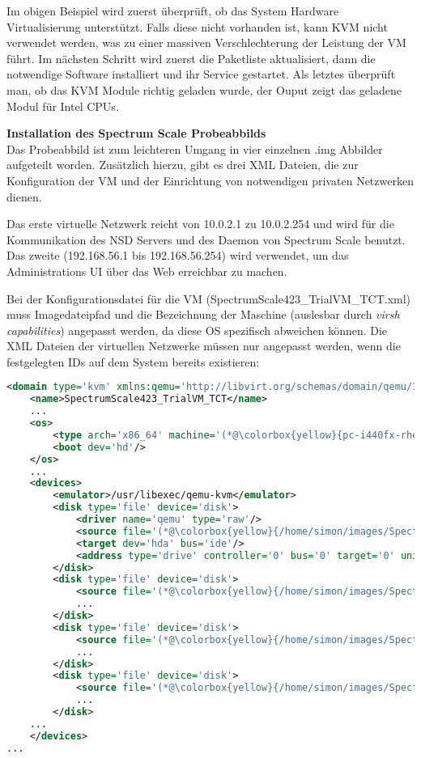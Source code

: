 Im obigen Beispiel wird zuerst überprüft, ob das System Hardware Virtualisierung unterstützt. Falls diese nicht vorhanden ist, kann KVM nicht verwendet werden, was zu einer massiven Verschlechterung der Leistung der VM führt.
Im nächsten Schritt wird zuerst die Paketliste aktualisiert, dann die notwendige Software installiert und ihr Service gestartet. Als letztes überprüft man, ob das KVM Module richtig geladen wurde, der Ouput zeigt das geladene Modul für Intel CPUs.

\textbf{Installation des Spectrum Scale Probeabbilds}\\
Das Probeabbild ist zum leichteren Umgang in vier einzelnen .img Abbilder aufgeteilt worden. Zusätzlich hierzu, gibt es drei XML Dateien, die zur Konfiguration der VM und der Einrichtung von notwendigen privaten Netzwerken dienen.

Das erste virtuelle Netzwerk reicht von 10.0.2.1 zu 10.0.2.254 und wird für die Kommunikation des \acs{NSD} Servers und des Daemon von Spectrum Scale benutzt. Das zweite (192.168.56.1 bis 192.168.56.254) wird verwendet, um das Administrations UI über das Web erreichbar zu machen.

Bei der Konfigurationsdatei für die VM (SpectrumScale423\_TrialVM\_TCT.xml) muss Imagedateipfad und die Bezeichnung der Maschine (auslesbar durch \textit{virsh capabilities}) angepasst werden, da diese OS spezifisch abweichen können. Die XML Dateien der virtuellen Netzwerke müssen nur angepasst werden, wenn die festgelegten IDs auf dem System bereits existieren: \\

\begin{lstlisting}[language=xml, caption=Veränderung der relevanten XML Konfiguration]
<domain type='kvm' xmlns:qemu='http://libvirt.org/schemas/domain/qemu/1.0'>
	<name>SpectrumScale423_TrialVM_TCT</name>
	...
	<os>
		<type arch='x86_64' machine='(*@\colorbox{yellow}{pc-i440fx-rhel7.0.0}@*)'>hvm</type> 
		<boot dev='hd'/>
	</os>
	...
	<devices>
		<emulator>/usr/libexec/qemu-kvm</emulator>
		<disk type='file' device='disk'>
			<driver name='qemu' type='raw'/>
			<source file='(*@\colorbox{yellow}{/home/simon/images/SpectrumScale421\_TrialVM-disk1.img}@*)'/>
			<target dev='hda' bus='ide'/>
			<address type='drive' controller='0' bus='0' target='0' unit='0'/>
		</disk>
		<disk type='file' device='disk'>
			<source file='(*@\colorbox{yellow}{/home/simon/images/SpectrumScale421\_TrialVM-disk2.img}@*)'/>
			...
		</disk>
		<disk type='file' device='disk'>
			<source file='(*@\colorbox{yellow}{/home/simon/images/SpectrumScale421\_TrialVM-disk3.img}@*)'/>
			...
		</disk>
		<disk type='file' device='disk'>
			<source file='(*@\colorbox{yellow}{/home/simon/images/SpectrumScale421\_TrialVM-disk4.img}@*)'/>
			...
		</disk>
	...
	</devices>
...
\end{lstlisting}

